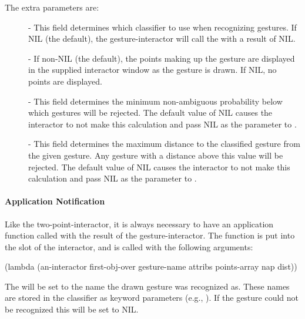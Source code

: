 The extra parameters are:
\begin{description}
\item[] 
 - This field determines which classifier to use when recognizing
gestures.  If NIL (the default), the gesture-interactor will call the
 with a result of NIL.

\item[] 
 - If non-NIL (the default), the points making up the gesture are displayed in
the supplied interactor window as the gesture is drawn.  If NIL, no points
are displayed.

\item[] 
 - This field determines the minimum non-ambiguous probability below which
gestures will be rejected.  The default value of NIL causes the
interactor to not make this calculation and pass NIL as the 
parameter to .

\item[] 
 - This field determines the maximum distance to the classified
gesture from the given gesture.  Any gesture with a distance above
this value will be rejected.
The default value of NIL causes the interactor to not make this
calculation and pass NIL as the  parameter to .
\end{description}

\paragraph{Application Notification}
\label{gestapplnotif}

Like the two-point-interactor, it is always necessary to have an
application function called with the result of the gesture-interactor.
The function is put into the  slot of the interactor,
and is called with the following arguments:
\begin{programexample}
(lambda (an-interactor first-obj-over gesture-name attribs points-array nap dist))
\end{programexample}

The  will be set to the name the drawn gesture was
recognized as.  These names are stored in the classifier as keyword
parameters (e.g., ).  If the gesture could not be recognized
this will be set to NIL.

